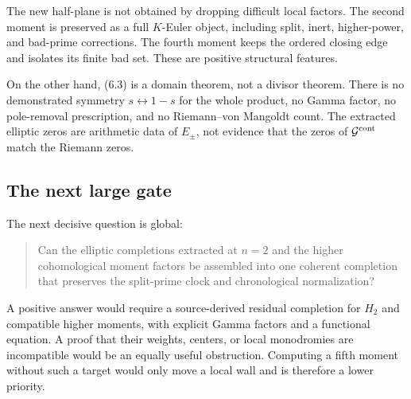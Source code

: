 The new half-plane is not obtained by dropping difficult local factors.
The second moment is preserved as a full \(K\)-Euler object, including
split, inert, higher-power, and bad-prime corrections.  The fourth moment
keeps the ordered closing edge and isolates its finite bad set.  These are
positive structural features.

On the other hand, (6.3) is a domain theorem, not a divisor theorem.
There is no demonstrated symmetry \(s\leftrightarrow1-s\) for the whole
product, no Gamma factor, no pole-removal prescription, and no
Riemann--von Mangoldt count.  The extracted elliptic zeros are arithmetic
data of \(E_\pm\), not evidence that the zeros of \(\mathcal G^{\mathrm{cont}}\)
match the Riemann zeros.

\subsection{The next large gate}

The next decisive question is global:

\begin{quote}
Can the elliptic completions extracted at \(n=2\) and the higher
cohomological moment factors be assembled into one coherent completion
that preserves the split-prime clock and chronological normalization?
\end{quote}

A positive answer would require a source-derived residual completion for
\(H_2\) and compatible higher moments, with explicit Gamma factors and a
functional equation.  A proof that their weights, centers, or local
monodromies are incompatible would be an equally useful obstruction.
Computing a fifth moment without such a target would only move a local wall
and is therefore a lower priority.
